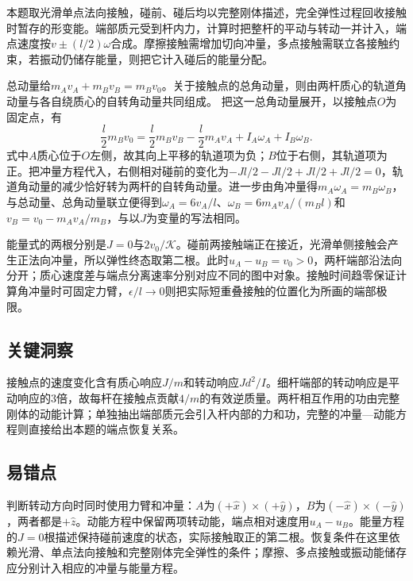 \documentclass[UTF8,fontset=fandol,a4paper,11pt]{ctexart}
\begin{document}
本题取光滑单点法向接触，碰前、碰后均以完整刚体描述，完全弹性过程回收接触时暂存的形变能。端部质元受到杆内力，计算时把整杆的平动与转动一并计入，端点速度按$v\pm(l/2)\omega$合成。摩擦接触需增加切向冲量，多点接触需联立各接触约束，若振动仍储存能量，则把它计入碰后的能量分配。

总动量给$m_Av_A+m_Bv_B=m_Bv_0$。关于接触点的总角动量，则由两杆质心的轨道角动量与各自绕质心的自转角动量共同组成。
把这一总角动量展开，以接触点$O$为固定点，有
\[
\frac l2m_Bv_0=\frac l2m_Bv_B-\frac l2m_Av_A+I_A\omega_A+I_B\omega_B.
\]
式中$A$质心位于$O$左侧，故其向上平移的轨道项为负；$B$位于右侧，其轨道项为正。把冲量方程代入，右侧相对碰前的变化为$-Jl/2-Jl/2+Jl/2+Jl/2=0$，轨道角动量的减少恰好转为两杆的自转角动量。进一步由角冲量得$m_A\omega_A=m_B\omega_B$，与总动量、总角动量联立便得到$\omega_A=6v_A/l$、$\omega_B=6m_Av_A/(m_Bl)$和$v_B=v_0-m_Av_A/m_B$，与以$J$为变量的写法相同。

能量式的两根分别是$J=0$与$2v_0/\mathcal K$。碰前两接触端正在接近，光滑单侧接触会产生正法向冲量，所以弹性终态取第二根。此时$u_A-u_B=v_0>0$，两杆端部沿法向分开；质心速度差与端点分离速率分别对应不同的图中对象。接触时间趋零保证计算角冲量时可固定力臂，$\epsilon/l\to0$则把实际短重叠接触的位置化为所画的端部极限。





\subsection*{关键洞察}

接触点的速度变化含有质心响应$J/m$和转动响应$Jd^2/I$。细杆端部的转动响应是平动响应的3倍，故每杆在接触点贡献$4/m$的有效逆质量。两杆相互作用的功由完整刚体的动能计算；单独抽出端部质元会引入杆内部的力和功，完整的冲量—动能方程则直接给出本题的端点恢复关系。



\subsection*{易错点}

判断转动方向时同时使用力臂和冲量：$A$为$(+\hat x)\times(+\hat y)$，$B$为$(-\hat x)\times(-\hat y)$，两者都是$+\hat z$。动能方程中保留两项转动能，端点相对速度用$u_A-u_B$。能量方程的$J=0$根描述保持碰前速度的状态，实际接触取正的第二根。恢复条件在这里依赖光滑、单点法向接触和完整刚体完全弹性的条件；摩擦、多点接触或振动能储存应分别计入相应的冲量与能量方程。
\end{document}
